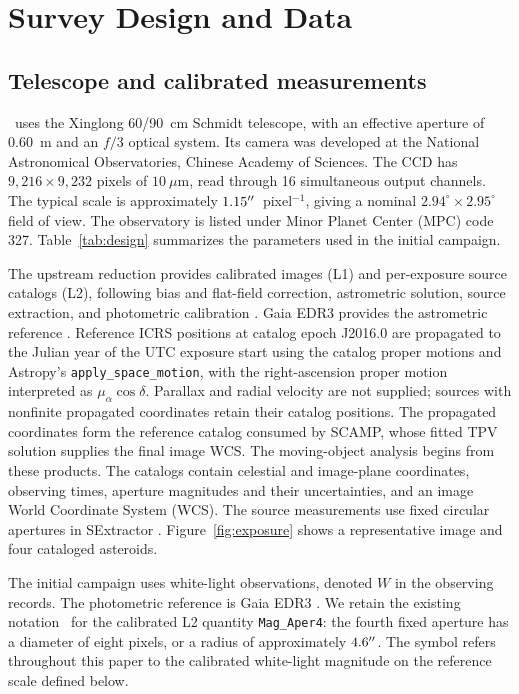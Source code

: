 \section{Survey Design and Data}
\label{sec:survey}

\subsection{Telescope and calibrated measurements}
\label{sec:facility}

\SHARP\ uses the Xinglong 60/90~cm Schmidt telescope, with an effective
aperture of 0.60~m and an $f/3$ optical system. Its camera was developed at
the National Astronomical Observatories, Chinese Academy of Sciences.
The CCD has $9,216\times9,232$ pixels of $10~\mu$m, read through 16
simultaneous output channels. The typical scale is approximately
$1.15^{\prime\prime}$~pixel$^{-1}$, giving a nominal
$2.94^\circ\times2.95^\circ$ field of view. The observatory is listed under
Minor Planet Center (MPC) code 327. Table~\ref{tab:design} summarizes the
parameters used in the initial campaign.

The upstream reduction provides calibrated images (L1) and per-exposure
source catalogs (L2), following bias and flat-field correction, astrometric
solution, source extraction, and photometric calibration
\citep[in preparation]{Li2026InPrep}. Gaia EDR3 provides the astrometric
reference \citep{GaiaEDR32021,Lindegren2021EDR3}. Reference ICRS positions
at catalog epoch J2016.0 are propagated to the Julian year of the UTC
exposure start using the catalog proper motions and Astropy's
\texttt{apply\_space\_motion}, with the right-ascension proper motion
interpreted as $\mu_\alpha\cos\delta$. Parallax and radial velocity are
not supplied; sources with nonfinite propagated coordinates retain their
catalog positions. The propagated coordinates form the reference catalog
consumed by SCAMP, whose fitted TPV solution supplies the final image WCS. The moving-object analysis
begins from these products. The catalogs contain celestial and
image-plane coordinates, observing times, aperture magnitudes and their
uncertainties, and an image World Coordinate System (WCS). The source
measurements use fixed circular apertures in SExtractor
\citep{BertinArnouts1996}. Figure~\ref{fig:exposure} shows a representative image
and four cataloged asteroids.

The initial campaign uses white-light observations, denoted $W$ in the
observing records. The photometric reference is Gaia EDR3
\citep{GaiaEDR32021,Riello2021EDR3}. We retain the
existing notation \gaper\ for the calibrated L2 quantity
\texttt{Mag\_Aper4}: the fourth fixed aperture has a diameter of eight
pixels, or a radius of approximately $4.6^{\prime\prime}$. The symbol refers
throughout this paper to the calibrated white-light magnitude on the
reference scale defined below.

